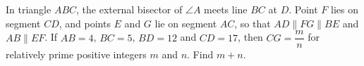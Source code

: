 In triangle $ABC$, the external bisector of $\angle A$ meets line $BC$ at $D$. Point $F$ lies on segment $CD$, and points $E$ and $G$ lie on segment $AC$, so that $AD\parallel FG\parallel BE$ and $AB\parallel EF$. If $AB=4$, $BC=5$, $BD=12$ and $CD=17$, then $CG=\dfrac mn$ for relatively prime positive integers $m$ and $n$. Find $m+n$.
